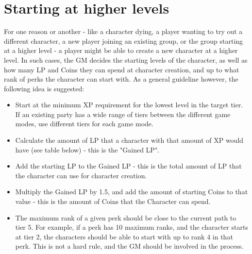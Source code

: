 \chapter{Starting at higher levels}\label{ch:createHigherLevelChars}
For one reason or another - like a character dying, a player wanting to try out a different character, a new player joining an existing group, or the group starting at a higher level - a player might be able to create a new character at a higher level.
In such cases, the GM decides the starting levels of the character, as well as how many LP and Coins they can spend at character creation, and up to what rank of perks the character can start with.
As a general guideline however, the following idea is suggested:
\begin{itemize}
	\item Start at the minimum XP requirement for the lowest level in the target tier.
	If an existing party has a wide range of tiers between the different game modes, use different tiers for each game mode.
	\item Calculate the amount of LP that a character with that amount of XP would have (see table below) - this is the "Gained LP".
	\item Add the starting LP to the Gained LP - this is the total amount of LP that the character can use for character creation.
	\item Multiply the Gained LP by 1.5, and add the amount of starting Coins to that value - this is the amount of Coins that the Character can spend.
	\item The maximum rank of a given perk should be close to the current path to tier 5.
	For example, if a perk has 10 maximum ranks, and the character starts at tier 2, the characters should be able to start with up to rank 4 in that perk.
	This is not a hard rule, and the GM should be involved in the process.
\end{itemize}